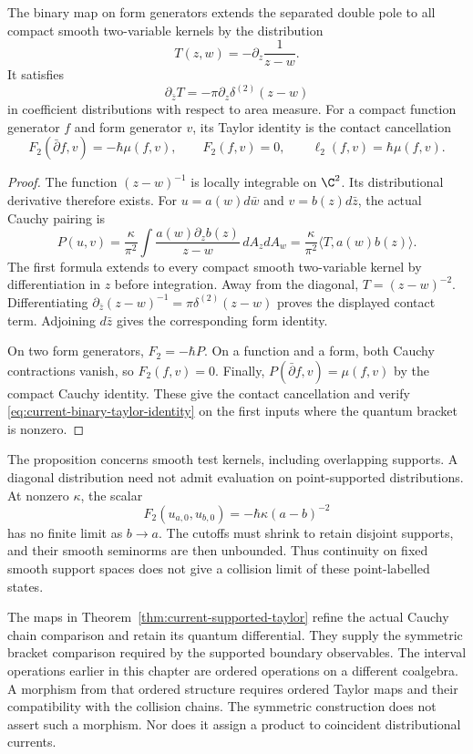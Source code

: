 \begin{proposition}
\label{prop:current-distributional-collision}
The binary map on form generators extends the separated double pole
to all compact smooth two-variable kernels by the distribution
\[
 T(z,w)=-\partial_z\frac1{z-w}.
\]
It satisfies
\[
 \partial_{\bar z}T=-\pi\partial_z\delta^{(2)}(z-w)
\]
in coefficient distributions with respect to area measure.
For a compact function generator $f$ and form generator $v$,
its Taylor identity is the contact cancellation
\[
 F_2(\bar\partial f,v)=-\hbar\mu(f,v),\qquad
 F_2(f,v)=0,\qquad \ell_2(f,v)=\hbar\mu(f,v).
\]
\end{proposition}
\begin{proof}
The function $(z-w)^{-1}$ is locally integrable on $\C^2$.
Its distributional derivative therefore exists.  For
$u=a(w)d\bar w$ and $v=b(z)d\bar z$, the actual Cauchy pairing is
\[
 P(u,v)=\frac{\kappa}{\pi^2}
       \int\frac{a(w)\partial_z b(z)}{z-w}\,dA_zdA_w
       =\frac{\kappa}{\pi^2}\langle T,a(w)b(z)\rangle.
\]
The first formula extends to every compact smooth two-variable
kernel by differentiation in $z$ before integration.
Away from the diagonal, $T=(z-w)^{-2}$.
Differentiating
$\partial_{\bar z}(z-w)^{-1}=\pi\delta^{(2)}(z-w)$
proves the displayed contact term.
Adjoining $d\bar z$ gives the corresponding form identity.

On two form generators, $F_2=-\hbar P$.
On a function and a form, both Cauchy contractions vanish,
so $F_2(f,v)=0$.  Finally,
$P(\bar\partial f,v)=\mu(f,v)$ by the compact Cauchy identity.
These give the contact cancellation and verify
\eqref{eq:current-binary-taylor-identity} on the first inputs
where the quantum bracket is nonzero.
\end{proof}

The proposition concerns smooth test kernels, including overlapping
supports.  A diagonal distribution need not admit evaluation on
point-supported distributions.  At nonzero $\kappa$, the scalar
\[
 F_2(u_{a,0},u_{b,0})=-\hbar\kappa(a-b)^{-2}
\]
has no finite limit as $b\to a$.  The cutoffs must shrink to retain
disjoint supports, and their smooth seminorms are then unbounded.
Thus continuity on fixed smooth support spaces does not give a
collision limit of these point-labelled states.

The maps in Theorem~\ref{thm:current-supported-taylor} refine the
actual Cauchy chain comparison and retain its quantum differential.
They supply the symmetric bracket comparison required by the
supported boundary observables.  The interval operations earlier
in this chapter are ordered operations on a different coalgebra.
A morphism from that ordered structure requires ordered Taylor maps
and their compatibility with the collision chains.
The symmetric construction does not assert such a morphism.
Nor does it assign a product to coincident distributional currents.
